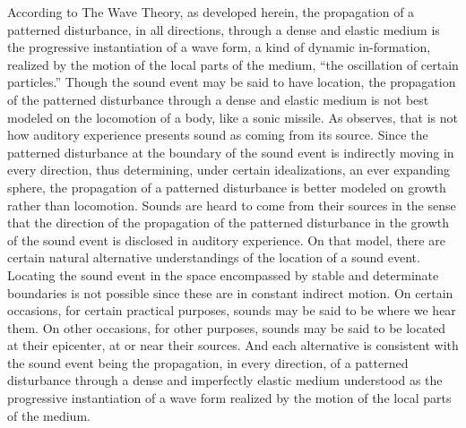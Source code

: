 According to The Wave Theory, as developed herein, the propagation of a patterned disturbance, in all directions, through a dense and elastic medium is the progressive instantiation of a wave form, a kind of dynamic in-formation, realized by the motion of the local parts of the medium, ``the oscillation of certain particles.'' Though the sound event may be said to have location, the propagation of the patterned disturbance through a dense and elastic medium is not best modeled on the locomotion of a body, like a sonic missile. As \citet{OCallaghan:2007xy,OCallaghan:2009aa} observes, that is not how auditory experience presents sound as coming from its source.  Since the patterned disturbance at the boundary of the sound event is indirectly moving in every direction, thus determining, under certain idealizations, an ever expanding sphere, the propagation of a patterned disturbance is better modeled on growth rather than locomotion. Sounds are heard to come from their sources in the sense that the direction of the propagation of the patterned disturbance in the growth of the sound event is disclosed in auditory experience. On that model, there are certain natural alternative understandings of the location of a sound event. Locating the sound event in the space encompassed by stable and determinate boundaries is not possible since these are in constant indirect motion. On certain occasions, for certain practical purposes, sounds may be said to be where we hear them. On other occasions, for other purposes, sounds may be said to be located at their epicenter, at or near their sources. And each alternative is consistent with the sound event being the propagation, in every direction, of a patterned disturbance through a dense and imperfectly elastic medium understood as the progressive instantiation of a wave form realized by the motion of the local parts of the medium. 

